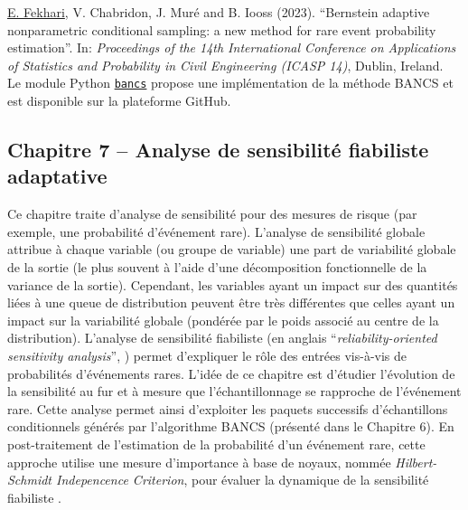 \noindent
{} \underline{E. Fekhari}, V. Chabridon, J. Muré and B. Iooss (2023). ``Bernstein adaptive nonparametric conditional sampling: a new method for rare event probability estimation''. In: \textit{Proceedings of the 14th International Conference on Applications of Statistics and Probability in Civil Engineering (ICASP 14)}, Dublin, Ireland.\\

\noindent
{} Le module Python \href{https://github.com/efekhari27/bancs}{\texttt{bancs}} propose une implémentation de la méthode BANCS et est disponible sur la plateforme GitHub. 

\subsection*{Chapitre 7 -- Analyse de sensibilité fiabiliste adaptative}

Ce chapitre traite d'analyse de sensibilité pour des mesures de risque (par exemple, une probabilité d'événement rare). 
L'analyse de sensibilité globale \cite{daveiga_iooss_2021} attribue à chaque variable (ou groupe de variable) une part de variabilité globale de la sortie (le plus souvent à l'aide d'une décomposition fonctionnelle de la variance de la sortie). 
Cependant, les variables ayant un impact sur des quantités liées à une queue de distribution peuvent être très différentes que celles ayant un impact sur la variabilité globale (pondérée par le poids associé au centre de la distribution). 
L'analyse de sensibilité fiabiliste (en anglais ``\textit{reliability-oriented sensitivity analysis}'', \cite{chabridon_2018_thesis}) permet d'expliquer le rôle des entrées vis-à-vis de probabilités d'événements rares. 
L'idée de ce chapitre est d'étudier l'évolution de la sensibilité au fur et à mesure que l'échantillonnage se rapproche de l'événement rare. 
Cette analyse permet ainsi d'exploiter les paquets successifs d'échantillons conditionnels générés par l'algorithme BANCS (présenté dans le Chapitre 6). 
En post-traitement de l'estimation de la probabilité d'un événement rare, cette approche utilise une mesure d'importance à base de noyaux, nommée \textit{Hilbert-Schmidt Indepencence Criterion}, pour évaluer la dynamique de la sensibilité fiabiliste \cite{marrel_chabridon_2021}.

